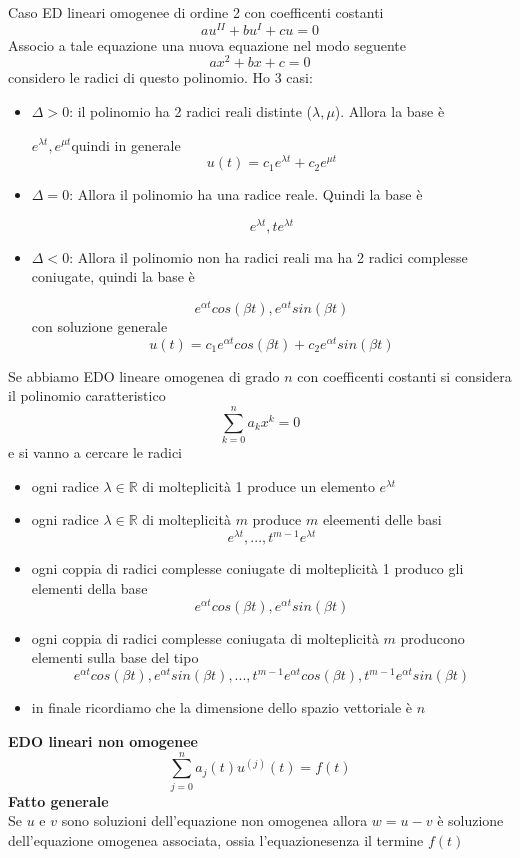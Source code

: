 \documentclass[12pt, a4paper]{article}
\begin{document}
Caso ED lineari omogenee di ordine 2 con coefficenti costanti\[au^{II}+bu^{I}+cu=0\]Associo a tale equazione una
nuova equazione nel modo seguente \[ax^{2}+bx+c=0\] considero le radici di questo polinomio. Ho 3 casi:
\begin{itemize}
    \item $\Delta>0$: il polinomio ha 2 radici reali distinte ($\lambda,\mu$). Allora la base è

          $e^{\lambda t},e^{\mu t}$quindi in generale \[u(t)=c_{1}e^{\lambda t}+c_{2}e^{\mu t}\]
    \item $\Delta = 0$: Allora il polinomio ha una radice reale. Quindi la base è

          \[e^{\lambda t},te^{\lambda t}\]
    \item $\Delta < 0$: Allora il polinomio non ha radici reali ma ha 2 radici complesse coniugate, quindi la base è

          \[e^{\alpha t}cos(\beta t), e^{\alpha t}sin(\beta t)\] con soluzione generale
          \[u(t)=c_{1}e^{\alpha t}cos(\beta t)+c_{2} e^{\alpha t}sin(\beta t)\]
\end{itemize}

Se abbiamo EDO lineare omogenea di grado $n$ con coefficenti costanti si considera il polinomio caratteristico
\[\sum^{n}_{k=0}a_{k}x^{k}=0\] e si vanno a cercare le radici
\begin{itemize}
    \item ogni radice $\lambda\in\mathbb{R}$ di molteplicità 1 produce un elemento $e^{\lambda t}$
    \item  ogni radice $\lambda\in\mathbb{R}$ di molteplicità $m$ produce $m$ eleementi delle basi
          \[e^{\lambda t},...,t^{m-1}e^{\lambda t}\]
    \item ogni coppia di radici complesse coniugate di molteplicità 1 produco gli elementi della base
          \[e^{\alpha t}cos(\beta t), e^{\alpha t}sin(\beta t)\]
    \item ogni coppia di radici complesse coniugata di molteplicità $m$ producono elementi sulla base del tipo
          \[e^{\alpha t}cos(\beta t), e^{\alpha t}sin(\beta t),...,t^{m-1}e^{\alpha t}cos(\beta t), t^{m-1}e^{\alpha
              t}sin(\beta t)\]
    \item in finale ricordiamo che la dimensione dello spazio vettoriale è $n$
\end{itemize}

\textbf{EDO lineari non omogenee}\[\sum^{n}_{j=0}a_{j}(t)u^{(j)}(t)=f(t)\]
\textbf{Fatto generale}\\Se $u$ e $v$ sono soluzioni dell'equazione non omogenea allora $w=u-v$ è soluzione
dell'equazione omogenea associata, ossia l'equazionesenza il termine $f(t)$
\end{document}

